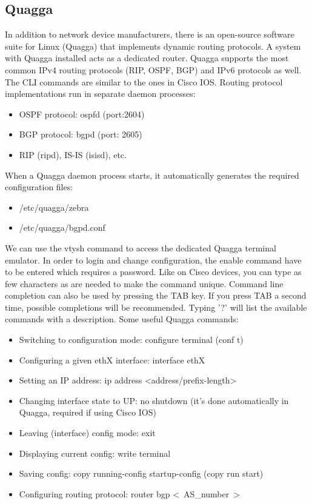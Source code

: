 \documentclass[a4paper]{article}
\begin{document}
\subsection{Quagga}
In addition to network device manufacturers, there is an open-source software suite for Linux (Quagga) that implements dynamic routing protocols. A system with Quagga installed acts as a dedicated router. Quagga supports the most common IPv4 routing protocols (RIP, OSPF, BGP) and IPv6 protocols as well. The CLI commands are similar to the ones in Cisco IOS. Routing protocol implementations run in separate daemon processes:
\begin{itemize}
    \item OSPF protocol: ospfd (port:2604)
    \item BGP protocol: bgpd (port: 2605)
    \item RIP (ripd), IS-IS (isisd), etc.
\end{itemize}

When a Quagga daemon process starts, it automatically generates the required configuration files:

\begin{itemize}
    \item /etc/quagga/zebra
    \item /etc/quagga/bgpd.conf
\end{itemize}

We can use the vtysh command to access the dedicated Quagga terminal emulator. In order to login and change configuration, the enable command have to be entered which requires a password. Like on Cisco devices, you can type as few characters as are needed to make the command unique. Command line completion can also be used by pressing the TAB key. If you press TAB a second time, possible completions will be recommended. Typing '?' will list the available commands with a description.
Some useful Quagga commands:

\begin{itemize}
\item Switching to configuration mode: configure terminal (conf t)
\item Configuring a given ethX interface: interface ethX
\item Setting an IP address: ip address <address/prefix-length>
\item Changing interface state to UP: no shutdown (it's done automatically in Quagga, required if using Cisco IOS)
\item Leaving (interface) config mode: exit
\item Displaying current config: write terminal
\item Saving config: copy running-config startup-config (copy run start)
\item Configuring routing protocol: router bgp \textless~AS_number~\textgreater
\end{itemize}
\end{document}
